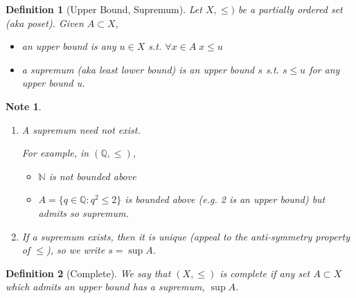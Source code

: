 \documentclass[11pt, oneside]{book}
\theoremstyle{break}
\newtheorem*{note}{Note}
\newtheorem{defn}{Definition}[section]
\newcommand{\bb}[1]{\mathbb{#1}}			%
\begin{document}
\begin{defn}[Upper Bound, Supremum]
	Let $X, \leq)$ be a partially ordered set (aka poset). Given $A \subset X$,
	\begin{itemize}
		\item an upper bound is any $u \in X$ s.t. $\forall x \in A \; x \leq u$
		\item a supremum (aka least lower bound) is an upper bound $s$ s.t. $s \leq u$ for any upper bound u.
	\end{itemize}
\end{defn}

\begin{note}
	\begin{enumerate}
		\item A supremum need not exist.

			For example, in $(\bb{Q}, \leq)$,
			\begin{itemize}
				\item $\bb{N}$ is not bounded above
				\item $A = \{q \in \bb{Q} : q^2 \leq 2\}$ is bounded above (e.g. 2 is an upper bound) but admits so supremum.
			\end{itemize}

		\item If a supremum exists, then it is unique (appeal to the anti-symmetry property of $\leq$), so we write $s = \sup A$.
	\end{enumerate}
\end{note}

\begin{defn}[Complete]
	We say that $(X,\leq)$ is complete if any set $A \subset X$ which admits an upper bound has a supremum, $\sup A$.	
\end{defn}
\end{document}
